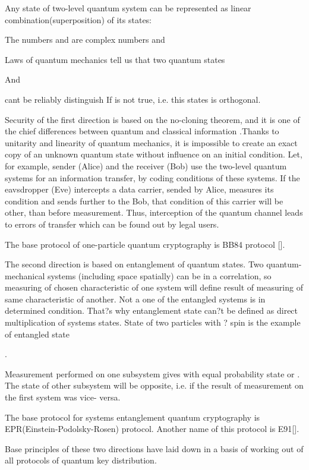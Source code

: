 Any state of two-level quantum system can be represented as linear
combination(superposition) of its states:

           
The numbers and are complex numbers and

           
Laws of quantum mechanics tell us that two quantum states


And


cant be reliably distinguish If is not true, i.e. this states is
orthogonal.

Security of the first direction is based on the no-cloning theorem,
and it is one of the chief differences between quantum and classical
information .Thanks to unitarity and linearity of quantum mechanics,
it is impossible to create an exact copy of an unknown quantum state
without influence on an initial condition. Let, for example, sender
(Alice) and the receiver (Bob) use the two-level quantum systems for
an information transfer, by coding conditions of these systems. If the
eavsdropper (Eve) intercepts a data carrier, sended by Alice, measures
its condition and sends further to the Bob, that condition of this
carrier will be other, than before measurement. Thus, interception of
the quantum channel leads to errors of transfer which can be found out
by legal users.

The base protocol of one-particle quantum cryptography is BB84
protocol [].

The second direction is based on entanglement of quantum states. Two
quantum-mechanical systems (including space spatially) can be in a
correlation, so measuring of chosen characteristic of one system will
define result of measuring of same characteristic of another. Not a
one of the entangled systems is in determined condition. That?s why
entanglement state can?t be defined as direct multiplication of
systems states. State of two particles with ? spin is the example of
entangled state

.

           
Measurement performed on one subsystem gives with equal probability
state or . The state of other subsystem will be opposite, i.e.  if the
result of measurement on the first system was vice- versa.

The base protocol for systems entanglement quantum cryptography is
EPR(Einstein-Podolsky-Rosen) protocol. Another name of this protocol
is E91[].

Base principles of these two directions have laid down in a basis of
working out of all protocols of quantum key distribution.



